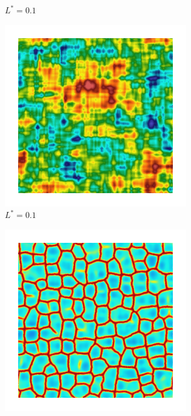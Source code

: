 \begin{figure}[!htbp]
\begin{subfigure}[b]{0.15\textwidth}
    \caption{$L^* = 0.1$}
    \label{fig: Chapter4/2D/Gc_exp_cartesian_10_10_rho_0_seed_b}
  \end{subfigure}
  \begin{subfigure}[b]{0.15\textwidth}
    \includegraphics[width=\textwidth]{Chapter4/figures/2D/psic_exp_cartesian_10_10_rho_0_seed_b.png}
    \caption{$L^* = 0.1$}
    \label{fig: Chapter4/2D/psic_exp_cartesian_10_10_rho_0_seed_b}
  \end{subfigure}
  \begin{subfigure}[b]{0.15\textwidth}
    \includegraphics[width=\textwidth]{Chapter4/figures/2D/d_exp_cartesian_10_10_rho_0_seed_b.png}
    \caption{}
    \label{fig: Chapter4/2D/d_exp_cartesian_10_10_rho_0_seed_b}
  \end{subfigure}


\end{figure}
